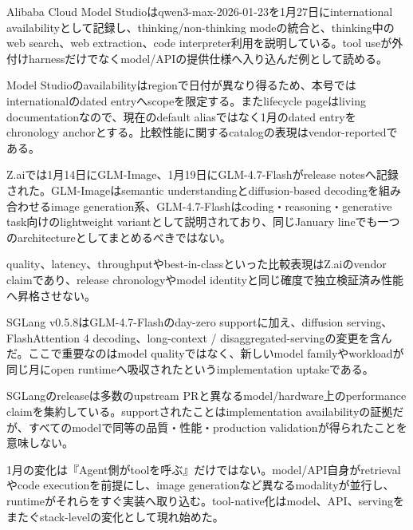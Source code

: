 
Alibaba Cloud Model Studioはqwen3-max-2026-01-23を1月27日にinternational availabilityとして記録し、thinking/non-thinking modeの統合と、thinking中のweb search、web extraction、code interpreter利用を説明している。tool useが外付けharnessだけでなくmodel/APIの提供仕様へ入り込んだ例として読める。\autocite{src-eac8dfbeb78c}


\begin{claimboundary}
Model Studioのavailabilityはregionで日付が異なり得るため、本号ではinternationalのdated entryへscopeを限定する。またlifecycle pageはliving documentationなので、現在のdefault aliasではなく1月のdated entryをchronology anchorとする。比較性能に関するcatalogの表現はvendor-reportedである。\autocite{src-eac8dfbeb78c}
\end{claimboundary}

Z.aiでは1月14日にGLM-Image、1月19日にGLM-4.7-Flashがrelease notesへ記録された。GLM-Imageはsemantic understandingとdiffusion-based decodingを組み合わせるimage generation系、GLM-4.7-Flashはcoding・reasoning・generative task向けのlightweight variantとして説明されており、同じJanuary lineでも一つのarchitectureとしてまとめるべきではない。\autocite{src-9156c37fb1c2}


\begin{claimboundary}
quality、latency、throughputやbest-in-classといった比較表現はZ.aiのvendor claimであり、release chronologyやmodel identityと同じ確度で独立検証済み性能へ昇格させない。\autocite{src-9156c37fb1c2}
\end{claimboundary}

SGLang v0.5.8はGLM-4.7-Flashのday-zero supportに加え、diffusion serving、FlashAttention 4 decoding、long-context / disaggregated-servingの変更を含んだ。ここで重要なのはmodel qualityではなく、新しいmodel familyやworkloadが同じ月にopen runtimeへ吸収されたというimplementation uptakeである。\autocite{src-6a97353d35a9}


\begin{claimboundary}
SGLangのreleaseは多数のupstream PRと異なるmodel/hardware上のperformance claimを集約している。supportされたことはimplementation availabilityの証拠だが、すべてのmodelで同等の品質・性能・production validationが得られたことを意味しない。\autocite{src-6a97353d35a9}
\end{claimboundary}

1月の変化は『Agent側がtoolを呼ぶ』だけではない。model/API自身がretrievalやcode executionを前提にし、image generationなど異なるmodalityが並行し、runtimeがそれらをすぐ実装へ取り込む。tool-native化はmodel、API、servingをまたぐstack-levelの変化として現れ始めた。\autocite{src-6a97353d35a9,src-9156c37fb1c2,src-eac8dfbeb78c}
